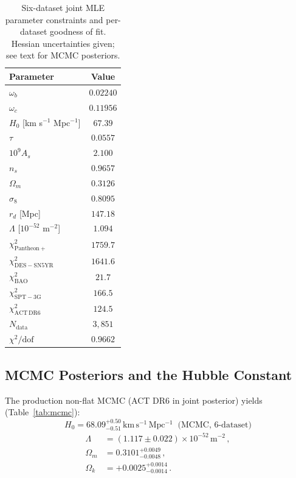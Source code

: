 \documentclass[12pt,a4paper]{article}
\newcommand{\Omm}{\Omega_m}
\newcommand{\kms}{\,\mathrm{km\,s^{-1}\,Mpc^{-1}}}
\newcommand{\msq}{\,\mathrm{m}^{-2}}
\begin{document}
\begin{table}[t]
\centering
\caption{Six-dataset joint MLE parameter constraints and per-dataset
goodness of fit. Hessian uncertainties given; see text for MCMC posteriors.}
\label{tab:mle}
\begin{tabular}{@{}lc@{}}
\toprule
Parameter & Value \\
\midrule
$\omega_b$ & $0.02240$ \\
$\omega_c$ & $0.11956$ \\
$H_0$ [km s$^{-1}$ Mpc$^{-1}$] & $67.39$ \\
$\tau$ & $0.0557$ \\
$10^9 A_s$ & $2.100$ \\
$n_s$ & $0.9657$ \\
\midrule
$\Omm$ & $0.3126$ \\
$\sigma_8$ & $0.8095$ \\
$r_d$ [Mpc] & $147.18$ \\
$\Lambda$ [$10^{-52}$ m$^{-2}$] & $1.094$ \\
\midrule
$\chi^2_\mathrm{Pantheon+}$ & $1759.7$ \\
$\chi^2_\mathrm{DES-SN5YR}$ & $1641.6$ \\
$\chi^2_\mathrm{BAO}$ & $21.7$ \\
$\chi^2_\mathrm{SPT-3G}$ & $166.5$ \\
$\chi^2_\mathrm{ACT\,DR6}$ & $124.5$ \\
\midrule
$N_\mathrm{data}$ & $3,851$ \\
$\chi^2/\mathrm{dof}$ & $\mathbf{0.9662}$ \\
\bottomrule
\end{tabular}
\end{table}

\subsection{MCMC Posteriors and the Hubble Constant}

The production non-flat MCMC (ACT DR6 in joint posterior) yields
(Table~\ref{tab:mcmc}):
\begin{equation}
\boxed{H_0 = 68.09^{+0.50}_{-0.51}\kms \;\;\text{(MCMC, 6-dataset)}}
\label{eq:H0}
\end{equation}
\begin{align}
\Lambda &= (1.117 \pm 0.022)\times 10^{-52}\msq\,,\label{eq:Lambda_mcmc}\\
\Omm &= 0.3101^{+0.0049}_{-0.0048}\,,\\
\Omega_k &= +0.0025^{+0.0014}_{-0.0014}\,.
\end{align}
\end{document}
